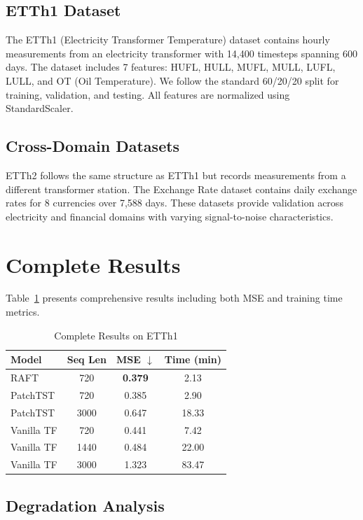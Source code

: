 \documentclass{article} %
\begin{document}
\subsection{ETTh1 Dataset}

The ETTh1 (Electricity Transformer Temperature) dataset contains hourly measurements from an electricity transformer with 14,400 timesteps spanning 600 days. The dataset includes 7 features: HUFL, HULL, MUFL, MULL, LUFL, LULL, and OT (Oil Temperature). We follow the standard 60/20/20 split for training, validation, and testing. All features are normalized using StandardScaler.

\subsection{Cross-Domain Datasets}

ETTh2 follows the same structure as ETTh1 but records measurements from a different transformer station. The Exchange Rate dataset contains daily exchange rates for 8 currencies over 7,588 days. These datasets provide validation across electricity and financial domains with varying signal-to-noise characteristics.

\section{Complete Results}

Table~\ref{tab:complete_results} presents comprehensive results including both MSE and training time metrics.

\begin{table}[h]
\centering
\caption{Complete Results on ETTh1}
\label{tab:complete_results}
\small
\begin{tabular}{lccc}
\toprule
\textbf{Model} & \textbf{Seq Len} & \textbf{MSE $\downarrow$} & \textbf{Time (min)} \\
\midrule
RAFT & 720 & \textbf{0.379} & 2.13 \\
PatchTST & 720 & 0.385 & 2.90 \\
PatchTST & 3000 & 0.647 & 18.33 \\
Vanilla TF & 720 & 0.441 & 7.42 \\
Vanilla TF & 1440 & 0.484 & 22.00 \\
Vanilla TF & 3000 & 1.323 & 83.47 \\
\bottomrule
\end{tabular}
\end{table}

\subsection{Degradation Analysis}
\end{document}
